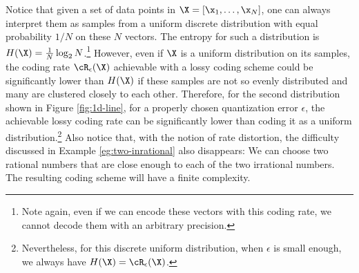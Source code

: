 \documentclass[../../book-main.tex]{subfiles}
\begin{document}
\begin{remark}
	Notice that given a set of data points in $\X = [\x_1,\ldots, \x_N]$, one can always interpret them as samples from a uniform discrete distribution with equal probability $1/N$ on these $N$ vectors. The entropy for such a distribution is $H(\X) = \frac{1}{N}\log_2 N$.\footnote{Note again, even if we can encode these vectors with this coding rate, we cannot decode them with an arbitrary precision.} However, even if $\X$ is  a uniform distribution on its samples, the coding rate $\cR_{\epsilon}(\X)$ achievable with a lossy coding scheme could be significantly lower than $H(\X)$ if these samples are not so evenly distributed and many are clustered closely to each other. Therefore, for the second distribution shown in Figure \ref{fig:1d-line}, for a properly chosen quantization error  $\epsilon$, the achievable lossy coding rate can be significantly lower than coding it as a uniform distribution.\footnote{Nevertheless, for this discrete uniform distribution, when $\epsilon$ is small enough, we always have $H(\X) = \cR_{\epsilon}(\X)$.} Also notice that, with the notion of rate distortion, the difficulty discussed in Example \ref{eg:two-inrational} also disappears: We can choose two rational numbers that are close enough to each of the two irrational numbers. The resulting coding scheme will have a finite complexity. 
\end{remark}
\end{document}
